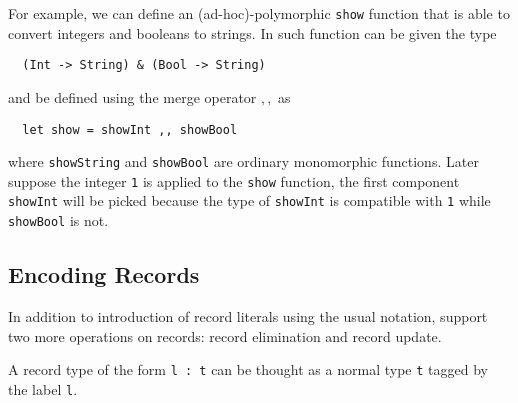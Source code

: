 For example, we can define an (ad-hoc)-polymorphic \lstinline{show} function
that is able to convert integers and booleans to strings. In \systemfi such function
can be given the type
\begin{lstlisting}
  (Int -> String) & (Bool -> String)
\end{lstlisting}
and be defined using the merge operator $ ,, $ as
\begin{lstlisting}
  let show = showInt ,, showBool
\end{lstlisting}
where \lstinline{showString} and \lstinline{showBool} are ordinary monomorphic
functions. Later suppose the integer \lstinline{1} is applied to the \lstinline{show} function,
the first component \lstinline{showInt} will be picked because the type of \lstinline{showInt}
is compatible with \lstinline{1} while \lstinline{showBool} is not.








\subsection{Encoding Records}

In addition to introduction of record literals using the usual notation, \systemfi
support two more operations on records: record elimination and record update.

A record type of the form \lstinline{l : t} can be thought as a normal type \lstinline{t}
tagged by the label \lstinline{l}.

